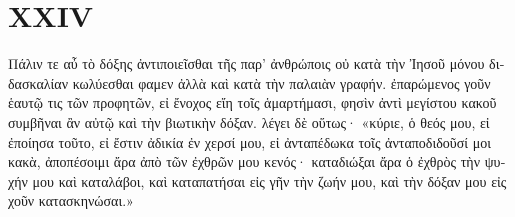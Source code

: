 \section*{XXIV}

\begin{greek}

Πάλιν τε αὖ τὸ δόξης ἀντιποιεῖσθαι τῆς παρ' ἀνθρώποις οὐ κατὰ τὴν Ἰησοῦ μόνου διδασκαλίαν κωλύεσθαι φαμεν ἀλλὰ καὶ κατὰ τὴν παλαιὰν γραφήν. ἐπαρώμενος γοῦν ἑαυτῷ τις τῶν προφητῶν, εἰ ἔνοχος εἴη τοῖς ἁμαρτήμασι, φησὶν ἀντὶ μεγίστου κακοῦ συμβῆναι ἂν αὐτῷ καὶ τὴν βιωτικὴν δόξαν. λέγει δὲ οὕτως· «κύριε, ὁ θεός μου, εἰ ἐποίησα τοῦτο, εἰ ἔστιν ἀδικία ἐν χερσί μου, εἰ ἀνταπέδωκα τοῖς ἀνταποδιδοῦσί μοι κακὰ, ἀποπέσοιμι ἄρα ἀπὸ τῶν ἐχθρῶν μου κενός· καταδιώξαι ἄρα ὁ ἐχθρὸς τὴν ψυχήν μου καὶ καταλάβοι, καὶ καταπατήσαι εἰς γῆν τὴν ζωήν μου, καὶ τὴν δόξαν μου εἰς χοῦν κατασκηνώσαι.»


\end{greek}
